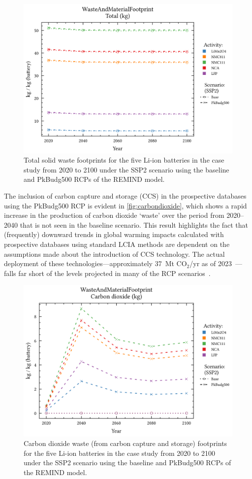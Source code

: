 \begin{figure}[H]
    \centering
    \includegraphics[width=0.7\linewidth]{figures/total_waste.png}
    \caption{Total solid waste footprints for the five Li-ion batteries in the case study from 2020 to 2100 under the SSP2 scenario using the baseline and PkBudg500 RCPs of the REMIND model.}\label{fig:waste_total}
\end{figure}

The inclusion of carbon capture and storage (CCS) in the prospective databases using the PkBudg500 RCP is evident in \autoref{fig:carbondioxide}, which shows a rapid increase in the production of carbon dioxide `waste' over the period from 2020--2040 that is not seen in the baseline scenario. This result highlights the fact that (frequently) downward trends in global warming impacts calculated with prospective databases using standard LCIA methods are dependent on the assumptions made about the introduction of CCS technology. The actual deployment of these technologies---approximately 37~Mt CO$_2$/yr as of 2023~\citep{dziejarski2023ccs}---falls far short of the levels projected in many of the RCP scenarios~\citep{sacchi2023premisedocs}.  

\begin{figure}[H]
    \centering
    \includegraphics[width=0.7\linewidth]{figures/carbondioxide.png}
    \caption{Carbon dioxide waste (from carbon capture and storage) footprints for the five Li-ion batteries in the case study from 2020 to 2100 under the SSP2 scenario using the baseline and PkBudg500 RCPs of the REMIND model.}\label{fig:carbondioxide}
\end{figure}

